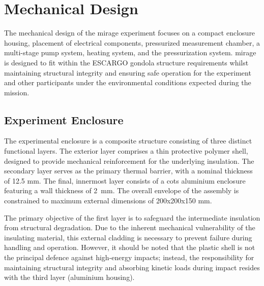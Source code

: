 \section{Mechanical Design}\label{mechanical_design}

The mechanical design of the \gls{mirage} experiment focuses on a compact enclosure housing, placement of electrical components, pressurized measurement chamber, a multi-stage pump system, heating system, and the pressurization system.
\gls{mirage} is designed to fit within the ESCARGO gondola structure requirements whilst maintaining structural integrity and ensuring safe operation for the experiment and other participants under the environmental conditions expected during the mission. 
%
%    

\subsection{Experiment Enclosure}
\label{sec:enclosure}
The experimental enclosure is a composite structure consisting of three distinct functional layers.
The exterior layer comprises a thin protective polymer shell, designed to provide mechanical reinforcement for the underlying insulation.
The secondary layer serves as the primary thermal barrier, with a nominal thickness of 12.5 mm.
The final, innermost layer consists of a \gls{cots} aluminium enclosure featuring a wall thickness of 2 mm.
The overall envelope of the assembly is constrained to maximum external dimensions of 200x200x150 mm.\par

The primary objective of the first layer is to safeguard the intermediate insulation from structural degradation.
Due to the inherent mechanical vulnerability of the insulating material, this external cladding is necessary to prevent failure during handling and operation.
However, it should be noted that the plastic shell is not the principal defence against high-energy impacts; instead, the responsibility for maintaining structural integrity and absorbing kinetic loads during impact resides with the third layer (aluminium housing).\par

